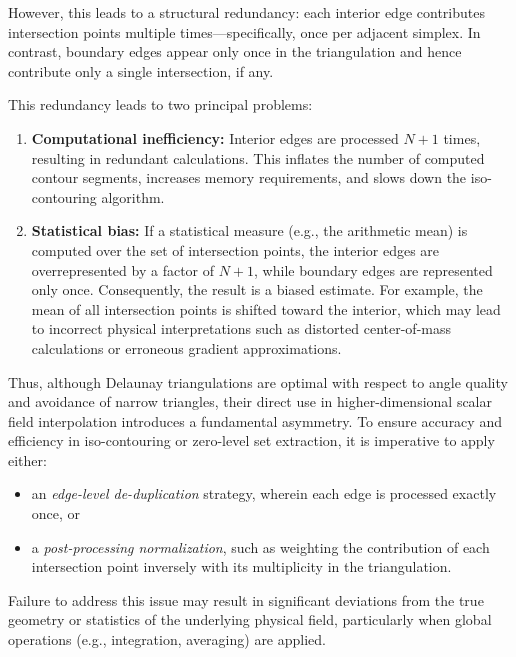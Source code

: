 However, this leads to a structural redundancy: each interior edge contributes intersection points multiple times---specifically, once per adjacent simplex. In contrast, boundary edges appear only once in the triangulation and hence contribute only a single intersection, if any.

This redundancy leads to two principal problems:
\begin{enumerate}
    \item \textbf{Computational inefficiency:} Interior edges are processed $N+1$ times, resulting in redundant calculations. This inflates the number of computed contour segments, increases memory requirements, and slows down the iso-contouring algorithm.
    
    \item \textbf{Statistical bias:} If a statistical measure (e.g., the arithmetic mean) is computed over the set of intersection points, the interior edges are overrepresented by a factor of $N+1$, while boundary edges are represented only once. Consequently, the result is a biased estimate. For example, the mean of all intersection points is shifted toward the interior, which may lead to incorrect physical interpretations such as distorted center-of-mass calculations or erroneous gradient approximations.
\end{enumerate}

Thus, although Delaunay triangulations are optimal with respect to angle quality and avoidance of narrow triangles, their direct use in higher-dimensional scalar field interpolation introduces a fundamental asymmetry. To ensure accuracy and efficiency in iso-contouring or zero-level set extraction, it is imperative to apply either:

\begin{itemize}
    \item an \emph{edge-level de-duplication} strategy, wherein each edge is processed exactly once, or
    \item a \emph{post-processing normalization}, such as weighting the contribution of each intersection point inversely with its multiplicity in the triangulation.
\end{itemize}

Failure to address this issue may result in significant deviations from the true geometry or statistics of the underlying physical field, particularly when global operations (e.g., integration, averaging) are applied.
